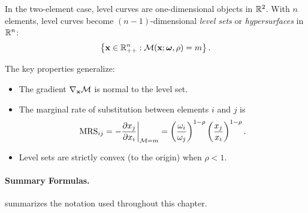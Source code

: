 In the two-element case, level curves are one-dimensional objects in $\mathbb{R}^2$. With $n$ elements, level curves become $(n-1)$-dimensional \emph{level sets} or \emph{hypersurfaces} in $\mathbb{R}^n$:
\begin{equation}
\left\{ \mathbf{x} \in \mathbb{R}_{++}^n : \mathcal{M}(\mathbf{x}; \boldsymbol{\omega}, \rho) = m \right\}.
\end{equation}

The key properties generalize:
\begin{itemize}[leftmargin=-0em]
    \item The gradient $\nabla_{\mathbf{x}} \mathcal{M}$ is normal to the level set.
    \item The marginal rate of substitution between elements $i$ and $j$ is
    \begin{equation}
    \text{MRS}_{ij} = -\frac{\partial x_j}{\partial x_i}\bigg|_{\mathcal{M} = m} = \left( \frac{\omega_i}{\omega_j} \right)^{1-\rho} \left( \frac{x_j}{x_i} \right)^{1-\rho}.
    \end{equation}
    \item Level sets are strictly convex (to the origin) when $\rho < 1$.
\end{itemize}

\paragraph{Summary Formulas.}

 summarizes the notation used throughout this chapter.

